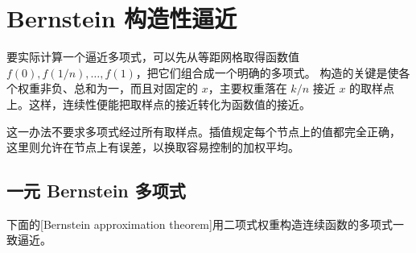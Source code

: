 \section{Bernstein 构造性逼近}
\label{b2:sec:approximation-bernstein}

要实际计算一个逼近多项式，可以先从等距网格取得函数值
\(f(0),f(1/n),\ldots,f(1)\)，把它们组合成一个明确的多项式。
构造的关键是使各个权重非负、总和为一，而且对固定的 \(x\)，主要权重落在
\(k/n\) 接近 \(x\) 的取样点上。这样，连续性便能把取样点的接近转化为函数值的接近。

\ProseParagraphBreak
这一办法不要求多项式经过所有取样点。插值规定每个节点上的值都完全正确，
这里则允许在节点上有误差，以换取容易控制的加权平均。

\subsection{一元 Bernstein 多项式}
\label{b2:subsec:approximation-bernstein-univariate}

下面的[Bernstein approximation theorem]用二项式权重构造连续函数的多项式一致逼近。

